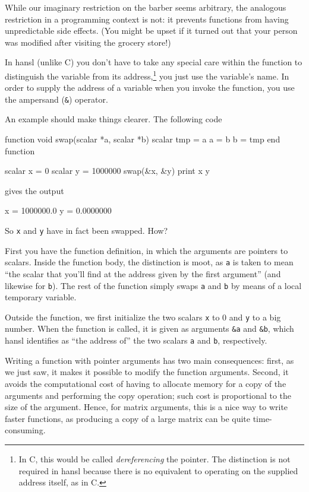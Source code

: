 While our imaginary restriction on the barber seems arbitrary, the
analogous restriction in a programming context is not: it prevents
functions from having unpredictable side effects. (You might be upset
if it turned out that your person was modified after visiting the
grocery store!)

In hansl (unlike C) you don't have to take any special care within the
function to distinguish the variable from its address,\footnote{In C,
  this would be called \emph{dereferencing} the pointer. The
  distinction is not required in hansl because there is no equivalent
  to operating on the supplied address itself, as in C.} you just use
the variable's name.  In order to supply the address of a variable
when you invoke the function, you use the ampersand (\verb|&|)
operator.

An example should make things clearer. The following code
\begin{code}
function void swap(scalar *a, scalar *b)
    scalar tmp = a
    a = b
    b = tmp
end function

scalar x = 0
scalar y = 1000000
swap(&x, &y)
print x y
\end{code}
gives the output
\begin{code}
              x =  1000000.0
              y =  0.0000000
\end{code}
So \texttt{x} and \texttt{y} have in fact been swapped. How?

First you have the function definition, in which the arguments are
pointers to scalars. Inside the function body, the distinction is
moot, as \verb|a| is taken to mean ``the scalar that you'll find at
the address given by the first argument'' (and likewise for
\verb|b|). The rest of the function simply swaps \texttt{a} and
\texttt{b} by means of a local temporary variable.

Outside the function, we first initialize the two scalars \texttt{x}
to 0 and \texttt{y} to a big number. When the function is called, it
is given as arguments \verb|&a| and \verb|&b|, which hansl identifies
as ``the address of'' the two scalars \texttt{a} and \texttt{b},
respectively.

Writing a function with pointer arguments has two main consequences:
first, as we just saw, it makes it possible to modify the function
arguments. Second, it avoids the computational cost of having to
allocate memory for a copy of the arguments and performing the copy
operation; such cost is proportional to the size of the argument.
Hence, for matrix arguments, this is a nice way to write faster
functions, as producing a copy of a large matrix can be quite
time-consuming.


